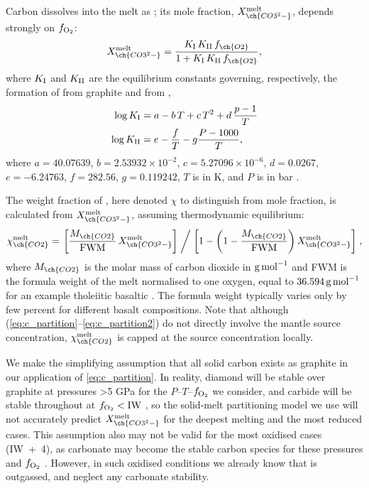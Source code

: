Carbon dissolves into the melt as ; its mole fraction, $X_{\ch{CO3^2-}}^{\rm melt}$, depends strongly on $f_{\rm O_2}$:
\begin{equation}\label{eq:c_partition}
    X_{\ch{CO3^2-}}^{\rm melt} = \frac{K_{\rm I} \, K_{\rm II} \, f_{\ch{O2}}}{1+K_{\rm I} \, K_{\rm II} \, f_{\ch{O2}}},
\end{equation}
where $K_{\rm I}$ and $K_{\rm II}$ are the equilibrium constants governing, respectively, the formation of  from graphite and  from ,
\begin{align}
    \log K_{\rm I} &= a - b \, T + c \, T^2 + d \, \frac{p-1}{T}\\ 
    \log K_{\rm II} &= e - \frac{f}{T} - g \frac{P-1000}{T},
\end{align}
where $a = 40.07639$, $b = 2.53932\times 10^{-2}$, $c = 5.27096\times 10^{-6}$, $d=0.0267$, $e = -6.24763$, $f=282.56$, $g=0.119242$, $T$ is in K, and $P$ is in bar \citep{holloway_highpressure_1992, Grott2011, Hirschmann2008}. 

The weight fraction of , here denoted $\chi$ to distinguish from mole fraction, is calculated from $X_{\ch{CO3^2-}}^{\rm melt}$, assuming thermodynamic equilibrium:
\begin{equation}\label{eq:c_partition2}
    \chi_{\ch{CO2}}^{\rm melt} = \left. \left[\frac{M_{\ch{CO2}}}{\rm FWM} \, X_{\ch{CO3^2-}}^{\rm melt} \right] \; \middle/ \; \left[ 1 - \left(1-\frac{M_{\ch{CO2}}}{\rm FWM} \right) X_{\ch{CO3^2-}}^{\rm melt}\right] \right. ,
\end{equation}
where $M_{\ch{CO2}}$ is the molar mass of carbon dioxide in ${\rm g\,mol}^{-1}$ and FWM is the formula weight of the melt normalised to one oxygen, equal to $36.594\,{\rm g \, mol}^{-1}$ for an example tholeiitic basaltic \citep{holloway_highpressure_1992, Grott2011}. The formula weight typically varies only by few percent for different basalt compositions. Note that although (\ref{eq:c_partition}--\ref{eq:c_partition2}) do not directly involve the mantle source concentration, $\chi_{\ch{CO2}}^{\rm melt}$ is capped at the source concentration locally.

We make the simplifying assumption that all solid carbon exists as graphite in our application of \eqref{eq:c_partition}. In reality, diamond will be stable over graphite at pressures \textgreater5 GPa for the $P$--$T$--$f_{\rm O_2}$ we consider, and carbide will be stable throughout at $f_{\rm O_2} < {\rm IW}$ \citep[e.g.,][]{shirey_diamonds_2019}, so the solid-melt partitioning model we use will not accurately predict $X_{\ch{CO3^2-}}^{\rm melt}$ for the deepest melting and the most reduced cases. This assumption also may not be valid for the most oxidised cases (IW~+~4), as carbonate may become the stable carbon species for these pressures and $f_{\rm O_2}$ \citep{Stagno2019}. However, in such oxidised conditions we already know that  is outgassed, and neglect any carbonate stability.

